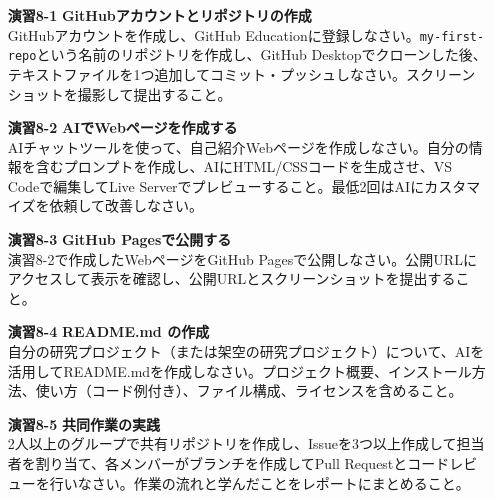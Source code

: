 \begin{enumerate}
\item[\textbf{演習8-1}] \textbf{GitHubアカウントとリポジトリの作成}\\
GitHubアカウントを作成し、GitHub Educationに登録しなさい。\texttt{my\allowbreak-first\allowbreak-repo}という名前のリポジトリを作成し、GitHub Desktopでクローンした後、テキストファイルを1つ追加してコミット・プッシュしなさい。スクリーンショットを撮影して提出すること。

\item[\textbf{演習8-2}] \textbf{AIでWebページを作成する}\\
AIチャットツールを使って、自己紹介Webページを作成しなさい。自分の情報を含むプロンプトを作成し、AIにHTML/CSSコードを生成させ、VS Codeで編集してLive Serverでプレビューすること。最低2回はAIにカスタマイズを依頼して改善しなさい。

\item[\textbf{演習8-3}] \textbf{GitHub Pagesで公開する}\\
演習8-2で作成したWebページをGitHub Pagesで公開しなさい。公開URLにアクセスして表示を確認し、公開URLとスクリーンショットを提出すること。

\item[\textbf{演習8-4}] \textbf{README.md の作成}\\
自分の研究プロジェクト（または架空の研究プロジェクト）について、AIを活用してREADME.mdを作成しなさい。プロジェクト概要、インストール方法、使い方（コード例付き）、ファイル構成、ライセンスを含めること。

\item[\textbf{演習8-5}] \textbf{共同作業の実践}\\
2人以上のグループで共有リポジトリを作成し、Issueを3つ以上作成して担当者を割り当て、各メンバーがブランチを作成してPull Requestとコードレビューを行いなさい。作業の流れと学んだことをレポートにまとめること。
\end{enumerate}
